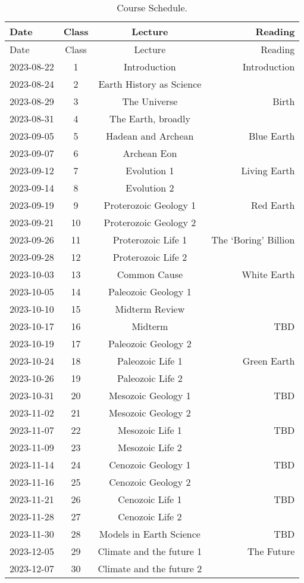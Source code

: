 \documentclass[11pt,]{article}
\begin{document}
\begin{longtable}[]{@{}lccr@{}}
\caption{Course Schedule.}\tabularnewline
\toprule()
Date & Class & Lecture & Reading \\
\midrule()
\endfirsthead
\toprule()
Date & Class & Lecture & Reading \\
\midrule()
\endhead
2023-08-22 & 1 & Introduction & Introduction \\
2023-08-24 & 2 & Earth History as Science & \\
2023-08-29 & 3 & The Universe & Birth \\
2023-08-31 & 4 & The Earth, broadly & \\
2023-09-05 & 5 & Hadean and Archean & Blue Earth \\
2023-09-07 & 6 & Archean Eon & \\
2023-09-12 & 7 & Evolution 1 & Living Earth \\
2023-09-14 & 8 & Evolution 2 & \\
2023-09-19 & 9 & Proterozoic Geology 1 & Red Earth \\
2023-09-21 & 10 & Proterozoic Geology 2 & \\
2023-09-26 & 11 & Proterozoic Life 1 & The `Boring' Billion \\
2023-09-28 & 12 & Proterozoic Life 2 & \\
2023-10-03 & 13 & Common Cause & White Earth \\
2023-10-05 & 14 & Paleozoic Geology 1 & \\
2023-10-10 & 15 & Midterm Review & \\
2023-10-17 & 16 & Midterm & TBD \\
2023-10-19 & 17 & Paleozoic Geology 2 & \\
2023-10-24 & 18 & Paleozoic Life 1 & Green Earth \\
2023-10-26 & 19 & Paleozoic Life 2 & \\
2023-10-31 & 20 & Mesozoic Geology 1 & TBD \\
2023-11-02 & 21 & Mesozoic Geology 2 & \\
2023-11-07 & 22 & Mesozoic Life 1 & TBD \\
2023-11-09 & 23 & Mesozoic Life 2 & \\
2023-11-14 & 24 & Cenozoic Geology 1 & TBD \\
2023-11-16 & 25 & Cenozoic Geology 2 & \\
2023-11-21 & 26 & Cenozoic Life 1 & TBD \\
2023-11-28 & 27 & Cenozoic Life 2 & \\
2023-11-30 & 28 & Models in Earth Science & TBD \\
2023-12-05 & 29 & Climate and the future 1 & The Future \\
2023-12-07 & 30 & Climate and the future 2 & \\
\bottomrule()
\end{longtable}
\end{document}
